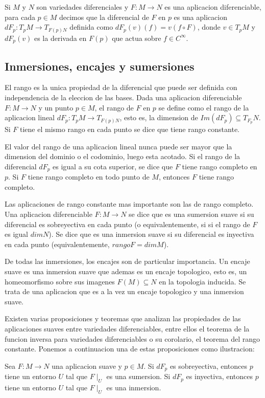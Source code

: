 \documentclass[12pt]{extarticle}
\newcommand{\<}{\langle}
\renewcommand{\>}{\rangle}
\theoremstyle{definition}
\begin{document}
Si $M$ y $N$ son variedades diferenciales y $F: M \rightarrow N$ es una
aplicacion diferenciable, para cada $p \in M$ decimos que la diferencial de $F$ en
$p$ es una aplicacion $dF_p:T_pM \rightarrow T_{F(p)N}$ definida como
$dF_p(v)(f) = v(f \circ F)$, donde $v \in T_pM$ y $dF_p(v)$ es la derivada en
$F(p)$ que actua sobre $f \in C^{\infty}$.

\subsection{Inmersiones, encajes y sumersiones}
El rango es la unica propiedad de la diferencial que puede ser definida
con independencia de la eleccion de las bases. Dada una aplicacion diferenciable
$F:M \rightarrow N$ y un punto $p \in M$, el rango de $F$ en $p$ se define como
el rango de la aplicacion lineal $dF_p:T_pM \rightarrow T_{F(p)N}$, esto es, la
dimension de $Im (dF_p) \subseteq T_{F_p}N$. Si $F$ tiene el mismo rango en cada
punto se dice que tiene rango constante.

El valor del rango de una aplicacion lineal nunca puede ser mayor que la
dimension del dominio o el codominio, luego esta acotado. Si el rango de la
diferencial $dF_p$ es igual a su cota superior, se dice que $F$ tiene rango
completo en $p$. Si $F$ tiene rango completo en todo punto de $M$, entonces
$F$ tiene rango completo.

Las aplicaciones de rango constante mas importante son las de rango completo.
Una aplicacion diferenciable $F: M \rightarrow N$ se dice que es una sumersion
suave si su diferencial es sobreyectiva en cada punto (o equivalentemente, si
si el rango de $F$ es igual $dim N$). Se dice que es una inmersion suave si su
diferencial es inyectiva en cada punto (equivalentemente, $rango F = dim M$).

De todas las inmersiones, los encajes son de particular importancia. Un encaje
suave es una inmersion suave que ademas es un encaje topologico, esto es, un
homeomorfismo sobre sus imagenes $F(M) \subseteq N$ en la topologia inducida. Se
trata de una aplicacion que es a la vez un encaje topologico y una inmersion
suave.

Existen varias proposiciones y teoremas que analizan las propiedades de las
aplicaciones suaves entre variedades diferenciables, entre ellos el teorema de
la funcion inversa para variedades diferenciables o su corolario, el teorema del
rango constante.
Ponemos a continuacion una de estas proposiciones como ilustracion:

Sea $F: M \rightarrow N$ una aplicacion suave y $p \in M$. Si $dF_p$ es
sobreyectiva, entonces $p$ tiene un entorno $U$ tal que $F\mid_U$ es una
sumersion. Si $dF_p$ es inyectiva, entonces $p$ tiene un entorno $U$ tal que
$F\mid_U$ es una inmersion.
\end{document}
